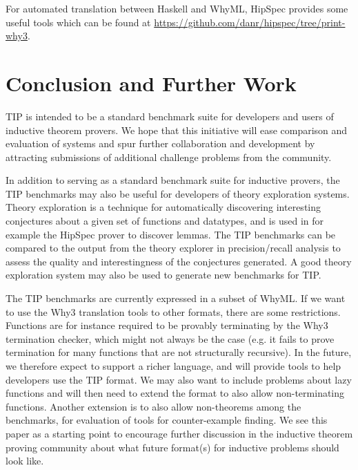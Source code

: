 \documentclass{llncs}
\begin{document}
For automated translation between Haskell and WhyML, HipSpec provides some useful tools which can be found at \url{https://github.com/danr/hipspec/tree/print-why3}.

\section{Conclusion and Further Work}
TIP is intended to be a standard benchmark suite for developers and users of inductive theorem provers. We hope that this initiative will ease comparison and evaluation of systems and spur further collaboration and development by attracting submissions of additional challenge problems from the community. 

In addition to serving as a standard benchmark suite for inductive provers, the TIP benchmarks may also be useful for developers of theory exploration systems. Theory exploration is a technique for automatically discovering interesting conjectures about a given set of functions and datatypes, and is used in for example the HipSpec prover to discover lemmas. The TIP benchmarks can be compared to the output from the theory explorer in precision/recall analysis to assess the quality and interestingness of the conjectures generated. A good theory exploration system may also be used to generate new benchmarks for TIP.

The TIP benchmarks are currently expressed in a subset of WhyML. If we want to use the Why3 translation tools to other formats, there are some restrictions. Functions are for instance required to be provably terminating by the Why3 termination checker, which might not always be the case (e.g. it fails to prove termination for many functions that are not structurally recursive).  
In the future, we therefore expect to support a richer language, and will provide tools to help developers use the TIP format.
We may also want to include problems about lazy functions and will then need to extend the format to also allow non-terminating functions.
Another extension is to also allow non-theorems among the benchmarks, for evaluation of tools for counter-example finding.  We see this paper as a starting point to encourage further discussion in the inductive theorem proving community about what future format(s) for inductive problems should look like.





\end{document}
